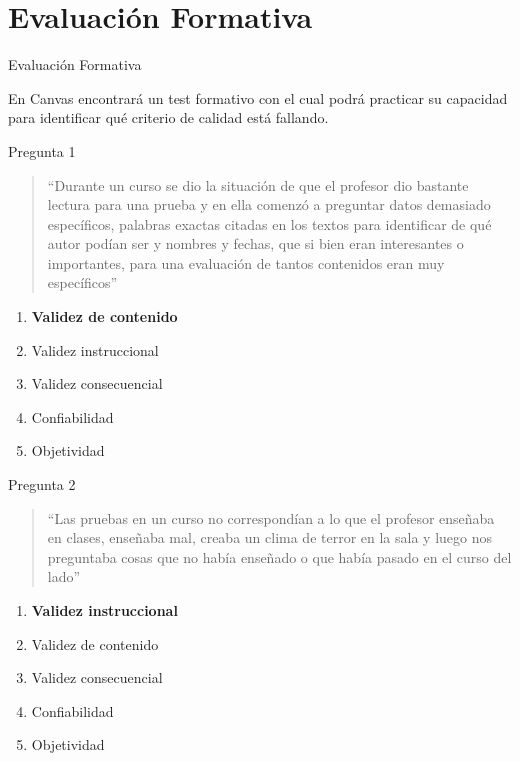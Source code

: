 \documentclass[11pt, aspectratio=169, xcolor=table,hyphens]{beamer}
\begin{document}
\section{Evaluación Formativa}

\begin{frame}{Evaluación Formativa}
	\begin{alertblock}{}
		En Canvas encontrará un test formativo con el cual podrá practicar su capacidad para identificar qué criterio de calidad está fallando.
	\end{alertblock}
\end{frame}

\begin{frame}{Pregunta 1}
	\begin{quote}
		``Durante un curso se dio la situación de que el profesor dio bastante lectura para una prueba y en ella comenzó a preguntar datos demasiado específicos, palabras exactas citadas en los textos para identificar de qué autor podían ser y nombres y fechas, que si bien eran interesantes o importantes, para una evaluación de tantos contenidos eran muy específicos''
	\end{quote}
	\begin{enumerate}
		\item[A.] \textbf<2->{Validez de contenido}
		\item[B.] Validez instruccional
		\item[C.] Validez consecuencial
		\item[D.] Confiabilidad
		\item[E.] Objetividad
	\end{enumerate}
\end{frame}

\begin{frame}{Pregunta 2}
	\begin{quote}
		``Las pruebas en un curso no correspondían a lo que el profesor enseñaba en clases, enseñaba mal, creaba un clima de terror en la sala y luego nos preguntaba cosas que no había enseñado o que había pasado en el curso del lado''
	\end{quote}
	\begin{enumerate}
		\item[A.] \textbf<2->{Validez instruccional}
		\item[B.] Validez de contenido
		\item[C.] Validez consecuencial
		\item[D.] Confiabilidad
		\item[E.] Objetividad
	\end{enumerate}
\end{frame}
\end{document}
